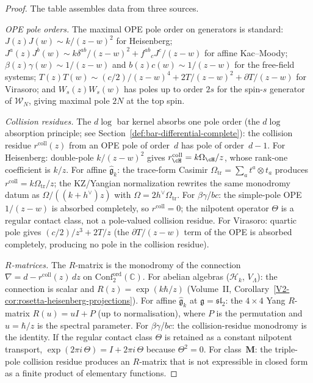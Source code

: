 \begin{proof}
The table assembles data from three sources.

\emph{OPE pole orders.} The maximal OPE pole order on generators
is standard:
$J(z)J(w) \sim k/(z{-}w)^2$ for Heisenberg;
$J^a(z)J^b(w) \sim k\delta^{ab}/(z{-}w)^2 + f^{ab}{}_c J^c/(z{-}w)$
for affine Kac--Moody;
$\beta(z)\gamma(w) \sim 1/(z{-}w)$ and
$b(z)c(w) \sim 1/(z{-}w)$ for the free-field systems;
$T(z)T(w) \sim (c/2)/(z{-}w)^4 + 2T/(z{-}w)^2 + \partial T/(z{-}w)$
for Virasoro; and
$W_s(z)W_s(w)$ has poles up to order $2s$ for the
spin-$s$ generator of $\mathcal{W}_N$, giving
maximal pole $2N$ at the top spin.

\emph{Collision residues.}
The $d\log$ bar kernel absorbs one pole order
(the $d\log$ absorption principle; see Section~\ref{def:bar-differential-complete}):
the collision residue $r^{\mathrm{coll}}(z)$ from an OPE pole of
order~$d$ has pole of order~$d{-}1$. For Heisenberg:
double-pole $k/(z{-}w)^2$ gives
$r^{\mathrm{coll}}_{\cH}=k\Omega_{\cH}/z$, whose rank-one coefficient
is $k/z$.
For affine $\widehat{\mathfrak{g}}_k$: the trace-form Casimir
$\Omega_{\mathrm{tr}} = \sum_a t^a \otimes t_a$ produces
$r^{\mathrm{coll}} = k\Omega_{\mathrm{tr}}/z$; the KZ/Yangian
normalization rewrites the same monodromy datum as
$\Omega/((k+h^\vee)z)$ with $\Omega=2h^\vee\Omega_{\mathrm{tr}}$.
For $\beta\gamma$/$bc$: the simple-pole OPE $1/(z{-}w)$ is absorbed
completely, so $r^{\mathrm{coll}}=0$; the nilpotent operator
$\Theta$ is a regular contact class, not a pole-valued collision
residue.
For Virasoro: quartic pole gives
$(c/2)/z^3 + 2T/z$ (the $\partial T/(z{-}w)$ term of the OPE is
absorbed completely, producing no pole in the collision residue).

\emph{$R$-matrices.}
The $R$-matrix is the monodromy of the connection
$\nabla = d - r^{\mathrm{coll}}(z)\,dz$ on
$\mathrm{Conf}_2^{\mathrm{ord}}(\mathbb{C})$.
For abelian algebras ($\mathcal{H}_k$, $V_\Lambda$):
the connection is scalar and
$R(z) = \exp(k\hbar/z)$
(Volume~II, Corollary~\ref*{V2-cor:rosetta-heisenberg-projections}).
For affine $\widehat{\mathfrak{g}}_k$ at $\mathfrak{g}
= \mathfrak{sl}_2$: the $4 \times 4$ Yang $R$-matrix
$R(u) = uI + P$ (up to normalisation), where $P$ is
the permutation and $u = \hbar/z$ is the spectral parameter.
For $\beta\gamma$/$bc$: the collision-residue monodromy is the identity.
If the regular contact class $\Theta$ is retained as a constant
nilpotent transport, $\exp(2\pi i\,\Theta)=I+2\pi i\,\Theta$ because
$\Theta^2=0$.
For class~$\mathbf{M}$: the triple-pole collision residue
produces an $R$-matrix that is not expressible in closed form
as a finite product of elementary functions.


\end{proof}
